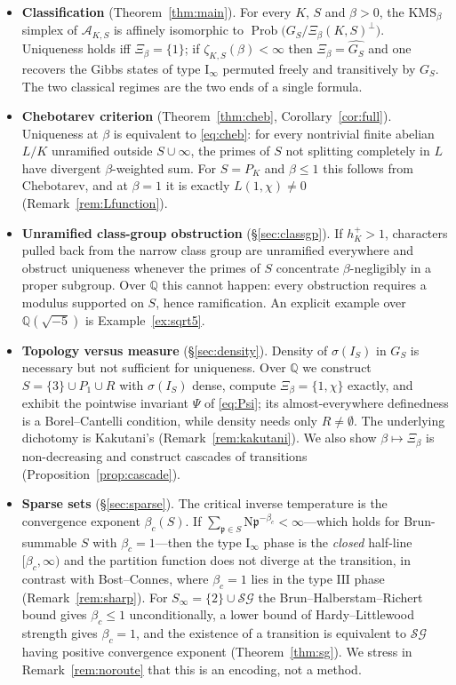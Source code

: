 \documentclass[11pt]{amsart}
\numberwithin{equation}{section}
\theoremstyle{definition}
\theoremstyle{remark}
\newcommand{\Q}{\mathbb{Q}}
\newcommand{\Prob}{\operatorname{Prob}}
\newcommand{\Ns}{\mathrm{N}}
\newcommand{\cA}{\mathcal{A}}
\newcommand{\pp}{\mathfrak{p}}
\newcommand{\SG}{\mathcal{SG}}
\begin{document}
\begin{itemize}
\item \textbf{Classification} (Theorem~\ref{thm:main}). For every $K$, $S$ and
$\beta>0$, the $\mathrm{KMS}_\beta$ simplex of $\cA_{K,S}$ is affinely
isomorphic to $\Prob\bigl(G_S/\Xi_\beta(K,S)^\perp\bigr)$. Uniqueness holds iff
$\Xi_\beta=\{1\}$; if $\zeta_{K,S}(\beta)<\infty$ then $\Xi_\beta=\widehat{G_S}$
and one recovers the Gibbs states of type $\mathrm I_\infty$ permuted freely
and transitively by $G_S$. The two classical regimes are the two ends of a
single formula.
\item \textbf{Chebotarev criterion} (Theorem~\ref{thm:cheb},
Corollary~\ref{cor:full}). Uniqueness at $\beta$ is equivalent to
\eqref{eq:cheb}: for every nontrivial finite abelian $L/K$ unramified outside
$S\cup\infty$, the primes of $S$ not splitting completely in $L$ have divergent
$\beta$-weighted sum. For $S=P_K$ and $\beta\le1$ this follows from Chebotarev,
and at $\beta=1$ it is exactly $L(1,\chi)\neq0$ (Remark~\ref{rem:Lfunction}).
\item \textbf{Unramified class-group obstruction} (\S\ref{sec:classgp}). If
$h^+_K>1$, characters pulled back from the narrow class group are unramified
everywhere and obstruct uniqueness whenever the primes of $S$ concentrate
$\beta$-negligibly in a proper subgroup. Over $\Q$ this cannot happen: every
obstruction requires a modulus supported on $S$, hence ramification. An
explicit example over $\Q(\sqrt{-5})$ is Example~\ref{ex:sqrt5}.
\item \textbf{Topology versus measure} (\S\ref{sec:density}). Density of
$\sigma(I_S)$ in $G_S$ is necessary but not sufficient for uniqueness. Over
$\Q$ we construct $S=\{3\}\cup P_1\cup R$ with $\sigma(I_S)$ dense, compute
$\Xi_\beta=\{1,\chi\}$ exactly, and exhibit the pointwise invariant
$\Psi$ of \eqref{eq:Psi}; its almost-everywhere definedness is a
Borel--Cantelli condition, while density needs only $R\neq\emptyset$. The
underlying dichotomy is Kakutani's (Remark~\ref{rem:kakutani}). We also show
$\beta\mapsto\Xi_\beta$ is non-decreasing and construct cascades of transitions
(Proposition~\ref{prop:cascade}).
\item \textbf{Sparse sets} (\S\ref{sec:sparse}). The critical inverse
temperature is the convergence exponent $\beta_c(S)$. If
$\sum_{\pp\in S}\Ns\pp^{-\beta_c}<\infty$---which holds for Brun-summable $S$
with $\beta_c=1$---then the type $\mathrm I_\infty$ phase is the \emph{closed}
half-line $[\beta_c,\infty)$ and the partition function does not diverge at the
transition, in contrast with Bost--Connes, where $\beta_c=1$ lies in the type
$\mathrm{III}$ phase (Remark~\ref{rem:sharp}). For $S_\infty=\{2\}\cup\SG$ the
Brun--Halberstam--Richert bound gives $\beta_c\le1$ unconditionally, a lower
bound of Hardy--Littlewood strength gives $\beta_c=1$, and the existence of a
transition is equivalent to $\SG$ having positive convergence exponent
(Theorem~\ref{thm:sg}). We stress in Remark~\ref{rem:noroute} that this is an
encoding, not a method.
\end{itemize}
\end{document}
